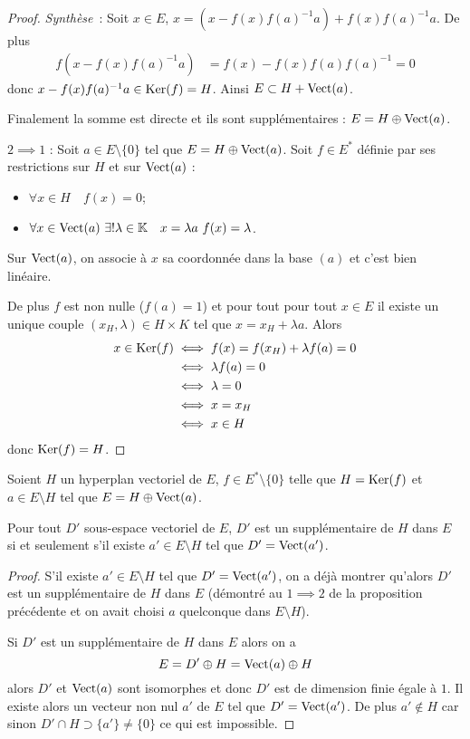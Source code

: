 \begin{proof}
  \emph{Synthèse}~: Soit $x \in E$, $x = (x- f(x) f(a)^{-1} a) + f(x) f(a)^{-1} a$. De plus
  \begin{align}
    f(x- f(x) f(a)^{-1} a)  &= f(x) -f(x)f(a)f(a)^{-1} = 0
  \end{align}
  donc $x- f(x) f(a)^{-1} a \in \operatorname{Ker}(f) = H$. Ainsi $E \subset H + \operatorname{Vect}(a)$.

  Finalement la somme est directe et ils sont supplémentaires : $E = H \oplus \operatorname{Vect}(a)$.

  $2 \implies 1$ : Soit $a \in E \setminus\{0\}$ tel que $E = H \oplus \operatorname{Vect}(a)$. Soit $f \in E^*$ définie par ses restrictions sur $H$ et sur $\operatorname{Vect}(a)$ :
  \begin{itemize}
  \item $\forall x \in H  \quad f(x)=0$;
  \item $\forall x \in \VectEngendre(a) \ \exists! \lambda \in \K \quad x=\lambda a \ f(x)=\lambda$.
  \end{itemize}
  Sur $\operatorname{Vect}(a)$, on associe à $x$ sa coordonnée dans la base $(a)$ et c'est bien linéaire.

  De plus $f$ est non nulle ($f(a)=1$) et pour tout pour tout $x \in E$ il existe un unique couple $(x_H, \lambda) \in H \times K$ tel que $x=x_H+\lambda a$. Alors
  \begin{align}
    x \in \operatorname{Ker}(f) & \iff f(x) = f(x_H) +\lambda f(a) =0\\
    &\iff \lambda f(a) =0\\
    &\iff \lambda =0\\
    &\iff x=x_H\\
    &\iff x \in H
  \end{align}
  donc $\operatorname{Ker}(f) =H$.
\end{proof}

Soient $H$ un hyperplan vectoriel de $E$, $f \in E^*\setminus\{0\}$ telle que $H = \operatorname{Ker}(f)$ et $a \in E\setminus H$ tel que $E = H \oplus \operatorname{Vect}(a)$.

\begin{prop}
  Pour tout $D'$ sous-espace vectoriel de $E$, $D'$ est un supplémentaire de $H$ dans $E$ si et seulement s'il existe $a' \in E \setminus H$ tel que $D'=\operatorname{Vect}(a')$.
\end{prop}
\begin{proof}
  S'il existe $a' \in E \setminus H$ tel que $D'=\operatorname{Vect}(a')$, on a déjà montrer qu'alors $D'$ est un supplémentaire de $H$ dans $E$ (démontré au $1 \implies 2$ de la proposition précédente et on avait choisi $a$ quelconque dans $E \setminus H$).

  Si $D'$ est un supplémentaire de $H$ dans $E$ alors on a
  \begin{equation}
    E=D' \oplus H = \operatorname{Vect}(a) \oplus H
  \end{equation}
  alors $D'$ et $\operatorname{Vect}(a)$ sont isomorphes et donc $D'$ est de dimension finie égale à $1$. Il existe alors un vecteur non nul $a'$ de $E$ tel que $D'=\operatorname{Vect}(a')$. De plus $a' \notin H$ car sinon $D' \cap H \supset \{a'\} \neq \{0\}$ ce qui est impossible.
\end{proof}


